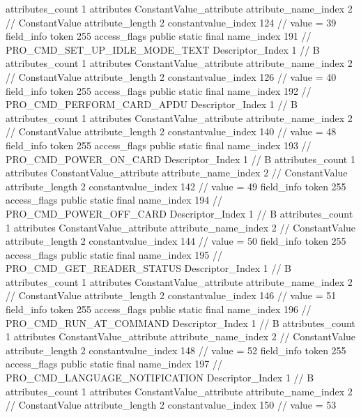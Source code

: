 {{{{{				attributes_count	1
				attributes {
				ConstantValue_attribute {
					attribute_name_index	2		// ConstantValue
					attribute_length	2
					constantvalue_index	124		// value = 39
				}
				}
			}
			field_info {
				token	255
				access_flags	public static final
				name_index	191		// PRO_CMD_SET_UP_IDLE_MODE_TEXT
				Descriptor_Index	1		// B
				attributes_count	1
				attributes {
				ConstantValue_attribute {
					attribute_name_index	2		// ConstantValue
					attribute_length	2
					constantvalue_index	126		// value = 40
				}
				}
			}
			field_info {
				token	255
				access_flags	public static final
				name_index	192		// PRO_CMD_PERFORM_CARD_APDU
				Descriptor_Index	1		// B
				attributes_count	1
				attributes {
				ConstantValue_attribute {
					attribute_name_index	2		// ConstantValue
					attribute_length	2
					constantvalue_index	140		// value = 48
				}
				}
			}
			field_info {
				token	255
				access_flags	public static final
				name_index	193		// PRO_CMD_POWER_ON_CARD
				Descriptor_Index	1		// B
				attributes_count	1
				attributes {
				ConstantValue_attribute {
					attribute_name_index	2		// ConstantValue
					attribute_length	2
					constantvalue_index	142		// value = 49
				}
				}
			}
			field_info {
				token	255
				access_flags	public static final
				name_index	194		// PRO_CMD_POWER_OFF_CARD
				Descriptor_Index	1		// B
				attributes_count	1
				attributes {
				ConstantValue_attribute {
					attribute_name_index	2		// ConstantValue
					attribute_length	2
					constantvalue_index	144		// value = 50
				}
				}
			}
			field_info {
				token	255
				access_flags	public static final
				name_index	195		// PRO_CMD_GET_READER_STATUS
				Descriptor_Index	1		// B
				attributes_count	1
				attributes {
				ConstantValue_attribute {
					attribute_name_index	2		// ConstantValue
					attribute_length	2
					constantvalue_index	146		// value = 51
				}
				}
			}
			field_info {
				token	255
				access_flags	public static final
				name_index	196		// PRO_CMD_RUN_AT_COMMAND
				Descriptor_Index	1		// B
				attributes_count	1
				attributes {
				ConstantValue_attribute {
					attribute_name_index	2		// ConstantValue
					attribute_length	2
					constantvalue_index	148		// value = 52
				}
				}
			}
			field_info {
				token	255
				access_flags	public static final
				name_index	197		// PRO_CMD_LANGUAGE_NOTIFICATION
				Descriptor_Index	1		// B
				attributes_count	1
				attributes {
				ConstantValue_attribute {
					attribute_name_index	2		// ConstantValue
					attribute_length	2
					constantvalue_index	150		// value = 53
}}}}}}}
